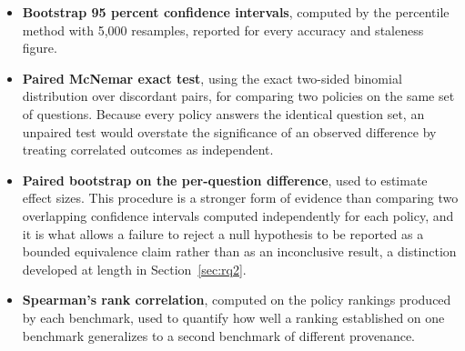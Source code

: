\begin{itemize}
\item \textbf{Bootstrap 95 percent confidence intervals}, computed by the percentile method with 5,000 resamples, reported for every accuracy and staleness figure.
\item \textbf{Paired McNemar exact test}, using the exact two-sided binomial distribution over discordant pairs, for comparing two policies on the same set of questions. Because every policy answers the identical question set, an unpaired test would overstate the significance of an observed difference by treating correlated outcomes as independent.
\item \textbf{Paired bootstrap on the per-question difference}, used to estimate effect sizes. This procedure is a stronger form of evidence than comparing two overlapping confidence intervals computed independently for each policy, and it is what allows a failure to reject a null hypothesis to be reported as a bounded equivalence claim rather than as an inconclusive result, a distinction developed at length in Section~\ref{sec:rq2}.
\item \textbf{Spearman's rank correlation}, computed on the policy rankings produced by each benchmark, used to quantify how well a ranking established on one benchmark generalizes to a second benchmark of different provenance.
\end{itemize}
